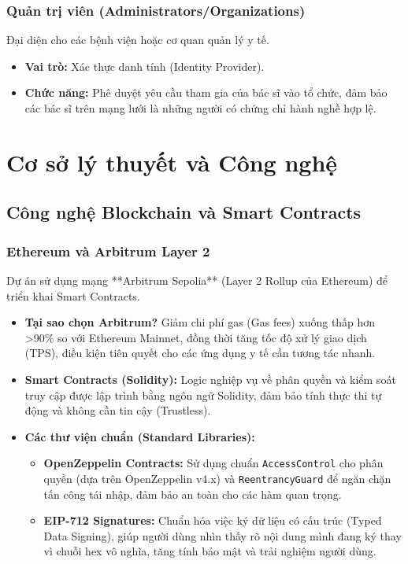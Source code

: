 \documentclass[12pt,a4paper]{report}
\begin{document}
\subsection{Quản trị viên (Administrators/Organizations)}
Đại diện cho các bệnh viện hoặc cơ quan quản lý y tế.
\begin{itemize}
    \item \textbf{Vai trò:} Xác thực danh tính (Identity Provider).
    \item \textbf{Chức năng:} Phê duyệt yêu cầu tham gia của bác sĩ vào tổ chức, đảm bảo các bác sĩ trên mạng lưới là những người có chứng chỉ hành nghề hợp lệ.
\end{itemize}

\chapter{Cơ sở lý thuyết và Công nghệ}\label{chuong-2}

\section{Công nghệ Blockchain và Smart Contracts}
\subsection{Ethereum và Arbitrum Layer 2}
Dự án sử dụng mạng **Arbitrum Sepolia** (Layer 2 Rollup của Ethereum) để triển khai Smart Contracts.
\begin{itemize}
    \item \textbf{Tại sao chọn Arbitrum?} Giảm chi phí gas (Gas fees) xuống thấp hơn >90\% so với Ethereum Mainnet, đồng thời tăng tốc độ xử lý giao dịch (TPS), điều kiện tiên quyết cho các ứng dụng y tế cần tương tác nhanh.
    \item \textbf{Smart Contracts (Solidity):} Logic nghiệp vụ về phân quyền và kiểm soát truy cập được lập trình bằng ngôn ngữ Solidity, đảm bảo tính thực thi tự động và không cần tin cậy (Trustless).
    \item \textbf{Các thư viện chuẩn (Standard Libraries):}
    \begin{itemize}
        \item \textbf{OpenZeppelin Contracts:} Sử dụng chuẩn \texttt{AccessControl} cho phân quyền (dựa trên OpenZeppelin v4.x) và \texttt{ReentrancyGuard} để ngăn chặn tấn công tái nhập, đảm bảo an toàn cho các hàm quan trọng.
        \item \textbf{EIP-712 Signatures:} Chuẩn hóa việc ký dữ liệu có cấu trúc (Typed Data Signing), giúp người dùng nhìn thấy rõ nội dung mình đang ký thay vì chuỗi hex vô nghĩa, tăng tính bảo mật và trải nghiệm người dùng.
    \end{itemize}
\end{itemize}
\end{document}

